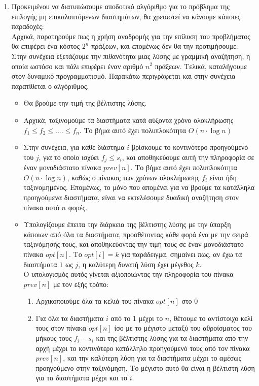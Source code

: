 \documentclass{article}
\begin{document}
\begin{enumerate}
	\item Προκειμένου να διατυπώσουμε αποδοτικό αλγόριθμο για το πρόβλημα της επιλογής μη επικαλυπτόμενων διαστημάτων, θα χρειαστεί να κάνουμε κάποιες παραδοχές:\\
	Αρχικά, παρατηρούμε πως η χρήση αναδρομής για την επίλυση του προβλήματος θα επιφέρει ένα κόστος $2^n$ πράξεων, και επομένως δεν θα την προτιμήσουμε. 
	Στην συνέχεια εξετάζουμε την πιθανότητα μιας λύσης με γραμμική αναζήτηση, η οποία ωστόσο και πάλι επιφέρει έναν αριθμό $n^2$ πράξεων. 
Τελικά, καταλήγουμε στον δυναμικό προγραμματισμό. Παρακάτω περιγράφεται και στην συνέχεια παρατίθεται ο αλγόριθμος.
\begin{itemize}
	\item Θα βρούμε την τιμή της βέλτιστης λύσης. 
	\item Αρχικά, ταξινομούμε τα διαστήματα κατά αύξοντα χρόνο ολοκλήρωσης $f_1 \leq f_2 \leq .... \leq f_n$.  Το βήμα αυτό έχει πολυπλοκότητα $O(n \cdot \log n )$ 
	\item Στην συνέχεια, για κάθε διάστημα $i$ βρίσκουμε το κοντινότερο προηγούμενό του $j$, για το οποίο ισχύει $ f_j \leq s_i$, και αποθηκεύουμε αυτή την πληροφορία σε έναν μονοδιάστατο πίνακα $prev[n]$. Το βήμα αυτό έχει πολυπλοκότητα $O(n \cdot \log n )$, καθώς ο πίνακας των χρόνων ολοκλήρωσης $f_i$ είναι ήδη ταξινομημένος. Επομένως, το μόνο που απομένει για να βρούμε τα κατάλληλα προηγούμενα διαστήματα, είναι να εκτελέσουμε δυαδική αναζήτηση στον πίνακα αυτό $n$ φορές. 
	\item Υπολογίζουμε έπειτα την διάρκεια της βέλτιστης λύσης με την ύπαρξη κάποιων από όλα τα διαστήματα, προσθέτοντας κάθε φορά ένα με την σειρά ταξινόμησής τους, και αποθηκεύοντας την τιμή τους σε έναν μονοδιάστατο πίνακα $opt[n]$. Το $opt[i] = k$ για παράδειγμα, σημαίνει πως, αν έχω τα διαστήματα $1$ ως $j$, η καλύτερη δυνατή λύση έχει μέγεθος $k$. 
\\Ο υπολογισμός αυτός γίνεται αξιοποιώντας την πληροφορία του πίνακα $prev[n]$ με τον εξής τρόπο:    
	\begin{enumerate}[label=(\alph*)] 
		\item Αρχικοποιούμε όλα τα κελιά του πίνακα $opt[n]$ στο 0 
		\item Για όλα τα διαστήματα $i$ από το 1 μέχρι το $n$, θέτουμε το αντίστοιχο κελί τους στον πίνακα $opt[n]$ ίσο με το μέγιστο μεταξύ του αθροίσματος του μήκους τους  $f_i - s_i$ και της βέλτιστης λύσης για τα διαστήματα από την αρχή μέχρι το κοντινότερο κατάλληλο προηγούμενό τους από τον πίνακα $prev[n]$,  και την καλύτερη λύση για τα διαστήματα μέχρι το αμέσως προηγούμενο στην ταξινόμηση. Το μέγιστο αυτό θα είναι η βέλτιστη λύση για τα διαστήματα μέχρι και το $i$. 

\end{enumerate}
\end{itemize}
\end{enumerate}
\end{document}
